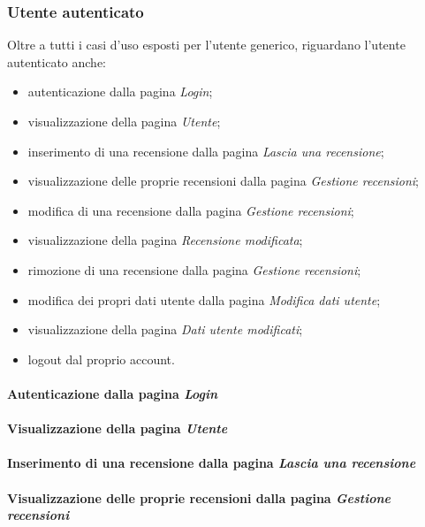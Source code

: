 \subsubsection{Utente autenticato}
\label{analisi-casi-uso-attori-principali-utente-autenticato}
Oltre a tutti i casi d'uso esposti per l'utente generico, riguardano l'utente autenticato anche:
\begin{itemize}
	\item autenticazione dalla pagina \textit{Login};
	\item visualizzazione della pagina \textit{Utente};
	\item inserimento di una recensione dalla pagina \textit{Lascia una recensione};
	\item visualizzazione delle proprie recensioni dalla pagina \textit{Gestione recensioni};
	\item modifica di una recensione dalla pagina \textit{Gestione recensioni};
	\item visualizzazione della pagina \textit{Recensione modificata};
	\item rimozione di una recensione dalla pagina \textit{Gestione recensioni};
	\item modifica dei propri dati utente dalla pagina \textit{Modifica dati utente};
	\item visualizzazione della pagina \textit{Dati utente modificati};
	\item logout dal proprio account.
\end{itemize}

\paragraph{Autenticazione dalla pagina \textit{Login}}
\label{analisi-casi-uso-attori-principali-utente-autenticato-1}

\paragraph{Visualizzazione della pagina \textit{Utente}}
\label{analisi-casi-uso-attori-principali-utente-autenticato-2}

\paragraph{Inserimento di una recensione dalla pagina \textit{Lascia una recensione}}
\label{analisi-casi-uso-attori-principali-utente-autenticato-3}

\paragraph{Visualizzazione delle proprie recensioni dalla pagina \textit{Gestione recensioni}}
\label{analisi-casi-uso-attori-principali-utente-autenticato-4}

